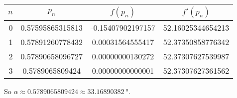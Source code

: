 \documentclass[../../../../Assignments]{subfiles}
\begin{document}
\begin{solution}
\begin{enumerate}[label = \alph*)]
            \begin{table}[H]
                \centering
                \begin{tabular}{r S[table-format=1.14] S[table-format=-1.14] S[table-format=2.14]}
                    \toprule
                    \(n\)  &      {\(p_n\)}     &     {\(f(p_n)\)}    &    {\(f'(p_n)\)}    \\
                      &  0.57595865315813  &  -0.15407902197157  &  52.16025344654213  \\
                        1  &  0.57891260778432  &   0.00031564555417  &  52.37350858776342  \\
                        2  &  0.57890658096727  &   0.00000000130272  &  52.37307627539987  \\
                        3  &  0.5789065809424   &   0.00000000000001  &  52.37307627361562  \\
                    \bottomrule
                \end{tabular}
            \end{table}

            So \(\alpha \approx \num{0.5789065809424} \approx
            \qty{33.16890382}{\degree}\).
    \end{enumerate}
\end{solution}
\end{document}
